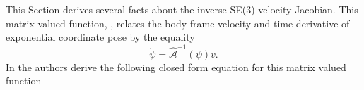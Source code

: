 
This Section derives several facts about the inverse SE(3) velocity
Jacobian.  This matrix valued function,
, relates
the body-frame velocity and time derivative of exponential coordinate
pose by the equality
%
\begin{equation}
\dot{\psi}=\hat{\mathcal{A}}^{-1}(\psi) v.
\end{equation}
%
In \cite{bullo1995_SE3_PD} the authors derive the following closed
form equation for this matrix valued function
%
